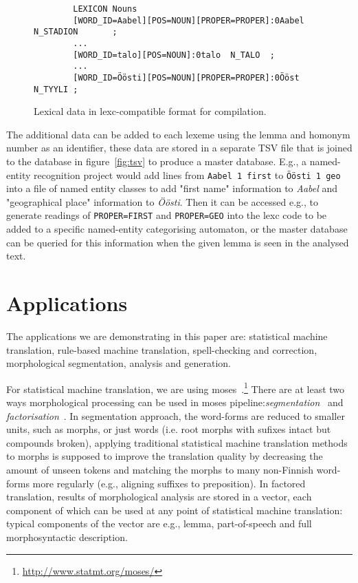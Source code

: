 \documentclass[11pt]{article}
\begin{document}
\begin{figure*}[ht]
    \centering
    \begin{verbatim}
        LEXICON Nouns
        [WORD_ID=Aabel][POS=NOUN][PROPER=PROPER]:0Aabel N_STADION       ;
        ...
        [WORD_ID=talo][POS=NOUN]:0talo  N_TALO  ;
        ...
        [WORD_ID=Öösti][POS=NOUN][PROPER=PROPER]:0Ööst  N_TYYLI ;
    \end{verbatim}
    \caption{Lexical data in lexc-compatible format for compilation.
    \label{fig:lexc}}
\end{figure*}

The additional data can be added to each lexeme using
the lemma and homonym number as an identifier, these
data are stored in a separate TSV file that is joined
to the database in figure~\ref{fig:tsv} to produce a
master database. E.g., a named-entity recognition
project would add lines from \texttt{Aabel 1 first}
to \texttt{Öösti 1 geo} into a file of named entity
classes to add "first name" information to
\emph{Aabel} and "geographical place" information to
\emph{Öösti}. Then it can be accessed e.g., to
generate readings of \texttt{PROPER=FIRST} and
\texttt{PROPER=GEO} into the lexc code to be added to
a specific named-entity categorising automaton, or
the master database can be queried for this
information when the given lemma is seen in the
analysed text.


\section{Applications}

The applications we are demonstrating in this paper are:
statistical machine translation, rule-based machine translation,
spell-checking and correction, morphological segmentation, analysis and
generation.

For statistical machine translation, we are using
moses~\cite{moses}.\footnote{\url{http://www.statmt.org/moses/}} There are at
least two ways morphological processing can be used in moses
pipeline:\emph{segmentation}~\cite{dyer2008generalizing} and
\emph{factorisation}~\cite{koehn2007factored}.  In segmentation approach, the
word-forms are reduced to smaller units, such as morphs, or just words (i.e.
root morphs with sufixes intact but compounds broken), applying traditional
statistical machine translation methods to morphs is supposed to improve the
translation quality by decreasing the amount of unseen tokens and matching the
morphs to many non-Finnish word-forms more regularly (e.g., aligning suffixes
to preposition). In factored translation, results of morphological analysis are
stored in a vector, each component of which can be used at any point of
statistical machine translation: typical components of the vector are e.g.,
lemma, part-of-speech and full morphosyntactic description.
\end{document}
